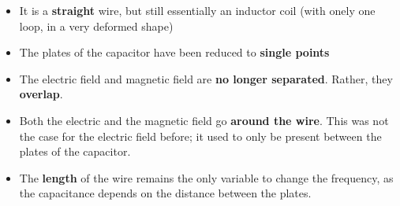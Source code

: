 \begin{itemize}
	
	\item It is a \textbf{straight} wire, but still essentially an inductor coil (with onely one loop, in a very deformed shape)

	\item The plates of the capacitor have been reduced to \textbf{single points}

	\item The electric field and magnetic field are \textbf{no longer separated}. Rather, they \textbf{overlap}.

	\item Both the electric and the magnetic field go \textbf{around the wire}. This was not the case for the electric field before; it used to only be present between the plates of the capacitor.

	\item The \textbf{length} of the wire remains the only variable to change the frequency, as the capacitance depends on the distance between the plates.

\end{itemize}

\pagebreak

\begin{figure}[h!]
	\centering
\end{figure}

